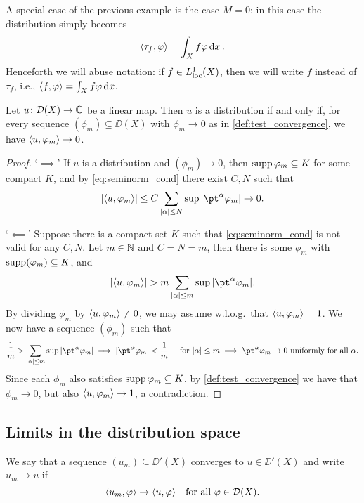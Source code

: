 A special case of the previous example is the case $M = 0$: in this case the distribution simply becomes
\[
\langle\tau_f, \varphi\rangle = \int_X f \varphi \dd{x}. 
\]
Henceforth we will abuse notation: if $f \in L^1_{\mathrm{loc}}(X)$, then we will write $f$ instead of $\tau_f$, i.e., $\langle f, \varphi\rangle = \int_X f\varphi \dd{x}$. 

\begin{lemma} \label{lem:seq_continuity}
    Let $u \colon \mathcal D(X) \to \mathbb C$ be a linear map. Then $u$ is a distribution if and only if, for every sequence $(\phi_m) \subseteq \DD(X)$ with $\phi_m \to 0$ as in \cref{def:test_convergence}, we have $\langle u, \varphi_m\rangle \to 0$. 
\end{lemma}

\begin{proof}
    `$\implies$' If $u$ is a distribution and $(\phi_m) \to 0$, then $\operatorname{supp}\varphi_m \subseteq K$ for some compact $K$, and by \cref{eq:seminorm_cond} there exist $C, N$ such that
    \[
    \abs{\ang{u, \phi_m}} \leq C \sum_{\abs{\alpha} \leq N} \sup \abs{\pt^\alpha \phi_m} \to 0. 
    \]
    
    `$\impliedby$' Suppose there is a compact set $K$ such that \cref{eq:seminorm_cond} is not valid for any $C, N$. Let $m \in \mathbb N$ and $C = N = m$, then there is some $\phi_m$ with $\operatorname{supp}(\varphi_m) \subseteq K$, and 
    \[
    \abs{\ang{u, \phi_m}} > m \sum_{\abs{\alpha} \leq m} \sup \abs{\pt^\alpha \phi_m}. 
    \]
    By dividing $\phi_m$ by $\langle u, \varphi_m\rangle \neq 0$, we may assume w.l.o.g.\ that $\langle u, \varphi_m\rangle = 1$. 
    We now have a sequence $(\phi_m)$ such that
    \[
    \frac1m > \sum_{\abs{\alpha} \leq m} \sup \abs{\pt^\alpha \phi_m} \implies  \abs{\pt^\alpha \phi_m} < \frac1m \quad\text{ for $\abs{\alpha} \leq m$} \implies \pt^\alpha \phi_m \to 0 \text{ uniformly for all $\alpha$}. 
    \]
    Since each $\phi_m$ also satisfies $\operatorname{supp}\varphi_m\subseteq K$, by \cref{def:test_convergence} we have that $\phi_m \to 0$, but also $\langle u, \varphi_m\rangle \to 1$, a contradiction. 
\end{proof}

\subsection{Limits in the distribution space}
\begin{definition}
    We say that a sequence $(u_m) \subseteq \DD'(X)$ converges to $u \in \DD'(X)$ and write $u_m \to u$ if 
    \[
    \langle u_m, \varphi\rangle \to \langle u, \varphi\rangle \quad\text{for all $\varphi \in \mathcal D(X)$}. 
    \]
\end{definition}

